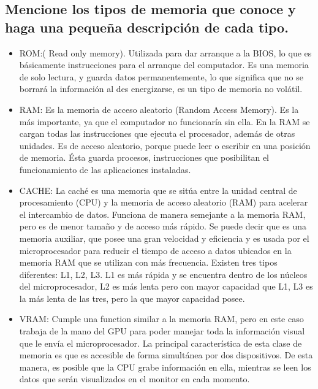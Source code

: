 \documentclass{article}
\begin{document}
\subsection{Mencione los tipos de memoria que conoce y haga una pequeña descripción de cada tipo.}
        \begin{itemize} 
        \item{}
        ROM:( Read only memory). Utilizada para dar arranque a la BIOS, lo que es básicamente instrucciones para el arranque del computador. Es una memoria de solo lectura, y guarda datos permanentemente, lo que significa que no se borrará la información al des energizarse, es un tipo de memoria no volátil. \cite{tiposdememoria} \cite{profesionalrivew}

        \item{}RAM: Es la memoria de acceso aleatorio (Random Access Memory). Es la más importante, ya que el computador no funcionaría sin ella. En la RAM se cargan todas las instrucciones que ejecuta el procesador, además de otras unidades. Es de acceso aleatorio, porque puede leer o escribir en una posición de memoria. Ésta guarda procesos, instrucciones que posibilitan el funcionamiento de las aplicaciones instaladas.\cite{Referencia}\cite{tiposdememoria} \cite{profesionalrivew}
        
        \item{}CACHE: La caché es una memoria que se sitúa entre la unidad central de procesamiento (CPU) y la memoria de acceso aleatorio (RAM) para acelerar el intercambio de datos. Funciona de manera semejante a la memoria RAM, pero es de menor tamaño y de acceso más rápido. Se puede decir que es una memoria auxiliar, que posee una gran velocidad y eficiencia y es usada por el microprocesador para reducir el tiempo de acceso a datos ubicados en la memoria RAM que se utilizan con más frecuencia. Existen tres tipos diferentes: L1, L2, L3. L1 es más rápida y se encuentra dentro de los núcleos del microprocesador, L2 es más lenta pero con mayor capacidad que L1, L3 es la más lenta de las tres, pero la que mayor capacidad posee.\cite{tiposdememoria} \cite{Referencia} \cite{cache}
        
        \item{}VRAM: Cumple una function similar a la memoria RAM, pero en este caso trabaja de la mano del GPU para poder manejar toda la información visual que le envía el microprocesador. La principal característica de esta clase de memoria es que es accesible de forma simultánea por dos dispositivos. De esta manera, es posible que la CPU grabe información en ella, mientras se leen los datos que serán visualizados en el monitor en cada momento.\cite{vram} \cite{vram_wiki}
        

\end{itemize}
\end{document}
